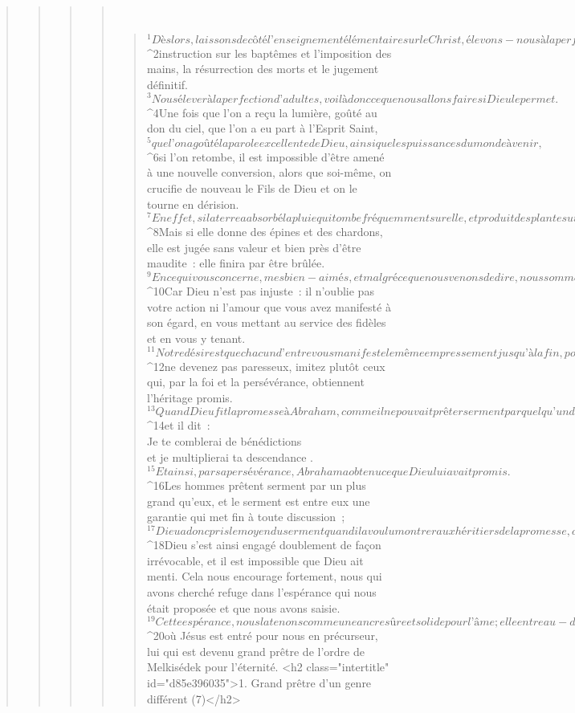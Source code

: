 \begin{verse}
\begin{verse}
\begin{verse}
\begin{verse}
         
      \bchapter{}
      \begin{verse}
${}^{1}Dès lors, laissons de côté l’enseignement élémentaire sur le Christ, élevons-nous à la perfection d’adultes, au lieu de poser une nouvelle fois les fondements, à savoir : conversion avec rejet des œuvres mortes et foi en Dieu, 
${}^{2}instruction sur les baptêmes et l’imposition des mains, la résurrection des morts et le jugement définitif. 
${}^{3}Nous élever à la perfection d’adultes, voilà donc ce que nous allons faire si Dieu le permet.
${}^{4}Une fois que l’on a reçu la lumière, goûté au don du ciel, que l’on a eu part à l’Esprit Saint, 
${}^{5}que l’on a goûté la parole excellente de Dieu, ainsi que les puissances du monde à venir, 
${}^{6}si l’on retombe, il est impossible d’être amené à une nouvelle conversion, alors que soi-même, on crucifie de nouveau le Fils de Dieu et on le tourne en dérision. 
${}^{7}En effet, si la terre a absorbé la pluie qui tombe fréquemment sur elle, et produit des plantes utiles à ceux pour qui elle est cultivée, elle reçoit de Dieu sa part de bénédiction. 
${}^{8}Mais si elle donne des épines et des chardons, elle est jugée sans valeur et bien près d’être maudite : elle finira par être brûlée.
${}^{9}En ce qui vous concerne, mes bien-aimés, et malgré ce que nous venons de dire, nous sommes convaincus que vous êtes dans la meilleure de ces situations, celle qui est liée au salut. 
${}^{10}Car Dieu n’est pas injuste : il n’oublie pas votre action ni l’amour que vous avez manifesté à son égard, en vous mettant au service des fidèles et en vous y tenant. 
${}^{11}Notre désir est que chacun d’entre vous manifeste le même empressement jusqu’à la fin, pour que votre espérance se réalise pleinement ; 
${}^{12}ne devenez pas paresseux, imitez plutôt ceux qui, par la foi et la persévérance, obtiennent l’héritage promis.
${}^{13}Quand Dieu fit la promesse à Abraham, comme il ne pouvait prêter serment par quelqu’un de plus grand que lui, il prêta serment par lui-même, 
${}^{14}et il dit :
        \\Je te comblerai de bénédictions
        \\et je multiplierai ta descendance .
${}^{15}Et ainsi, par sa persévérance, Abraham a obtenu ce que Dieu lui avait promis. 
${}^{16}Les hommes prêtent serment par un plus grand qu’eux, et le serment est entre eux une garantie qui met fin à toute discussion ; 
${}^{17}Dieu a donc pris le moyen du serment quand il a voulu montrer aux héritiers de la promesse, de manière encore plus claire, que sa décision était irrévocable. 
${}^{18}Dieu s’est ainsi engagé doublement de façon irrévocable, et il est impossible que Dieu ait menti. Cela nous encourage fortement, nous qui avons cherché refuge dans l’espérance qui nous était proposée et que nous avons saisie. 
${}^{19}Cette espérance, nous la tenons comme une ancre sûre et solide pour l’âme ; elle entre au-delà du rideau, dans le Sanctuaire 
${}^{20}où Jésus est entré pour nous en précurseur, lui qui est devenu grand prêtre de l’ordre de Melkisédek pour l’éternité.
      <h2 class="intertitle" id="d85e396035">1. Grand prêtre d’un genre différent (7)</h2>
      

\end{verse}
\end{verse}
\end{verse}
\end{verse}
\end{verse}
